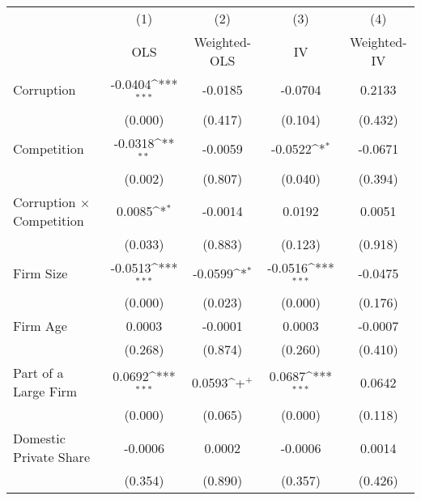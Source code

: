 {
\def\sym#1{\ifmmode^{#1}\else\(^{#1}\)\fi}
\begin{tabular}{l*{4}{c}}
\hline\hline
                    &\multicolumn{1}{c}{(1)}         &\multicolumn{1}{c}{(2)}         &\multicolumn{1}{c}{(3)}         &\multicolumn{1}{c}{(4)}         \\
                    &         OLS         &Weighted-OLS         &          IV         & Weighted-IV         \\
\hline
Corruption          &     -0.0404\sym{***}&     -0.0185         &     -0.0704         &      0.2133         \\
                    &     (0.000)         &     (0.417)         &     (0.104)         &     (0.432)         \\
Competition         &     -0.0318\sym{**} &     -0.0059         &     -0.0522\sym{*}  &     -0.0671         \\
                    &     (0.002)         &     (0.807)         &     (0.040)         &     (0.394)         \\
Corruption $\times$ Competition&      0.0085\sym{*}  &     -0.0014         &      0.0192         &      0.0051         \\
                    &     (0.033)         &     (0.883)         &     (0.123)         &     (0.918)         \\
Firm Size           &     -0.0513\sym{***}&     -0.0599\sym{*}  &     -0.0516\sym{***}&     -0.0475         \\
                    &     (0.000)         &     (0.023)         &     (0.000)         &     (0.176)         \\
Firm Age            &      0.0003         &     -0.0001         &      0.0003         &     -0.0007         \\
                    &     (0.268)         &     (0.874)         &     (0.260)         &     (0.410)         \\
Part of a Large Firm&      0.0692\sym{***}&      0.0593\sym{+}  &      0.0687\sym{***}&      0.0642         \\
                    &     (0.000)         &     (0.065)         &     (0.000)         &     (0.118)         \\
Domestic Private Share&     -0.0006         &      0.0002         &     -0.0006         &      0.0014         \\
                    &     (0.354)         &     (0.890)         &     (0.357)         &     (0.426)         \\

\end{tabular}}
